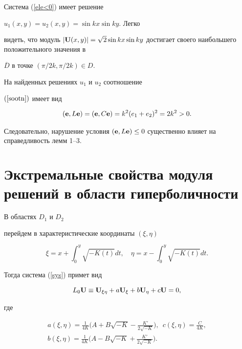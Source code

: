 Система (\ref{ele<0}) имеет решение


$u_1(x,y)=u_2(x,y)=\sin kx\sin ky$. Легко


видеть, что модуль $|{\bold U}(x,y)|=\sqrt 2\sin kx\sin


ky$ достигает своего наибольшего положительного значения в


$\overline D$ в точке $(\pi/2k,\pi/2k)\in D$.


На найденных решениях $u_1$ и $u_2$ соотношение


$(\ref{sootn})$ имеет вид


$$


({\bold e},L{\bold e})=({\bold e},C{\bold e})=k^2(e_1+e_2)^2=2k^2>0.


$$


Следовательно, нарушение условия $({\bold e},L{\bold e})\le


0$ существенно влияет на справедливость лемм 1--3.





\section{Экстремальные свойства модуля решений в области гиперболичности}





В областях $D_1$ и $D_2$


перейдем в характеристические координаты $(\xi, \eta)$


$$


\xi = x + \int_{0}^{y}\sqrt{-K(t)}dt,\quad


\eta = x - \int_{0}^{y}\sqrt{-K(t)}dt.


$$


Тогда система (\ref{sys}) примет вид


\begin{equation}\label{sys2}


L_0{\bold U}\equiv {\bold U}_{\xi\eta }+a{\bold U}_{\xi }+b{\bold


U}_{\eta }+c{\bold U}=0,


\end{equation}


где


\begin{gather*}


a(\xi,\eta)=\frac {1}{4K}\bigg (A+B\sqrt {-K}-\frac {K'}{2\sqrt{-K}}


\bigg),\ \;c(\xi,\eta)=\frac {C}{4K},\\


b(\xi,\eta)=\frac {1}{4K}\bigg (A-B\sqrt {-K}+\frac {K'}{2\sqrt{-K}}


\bigg).


\end{gather*}


